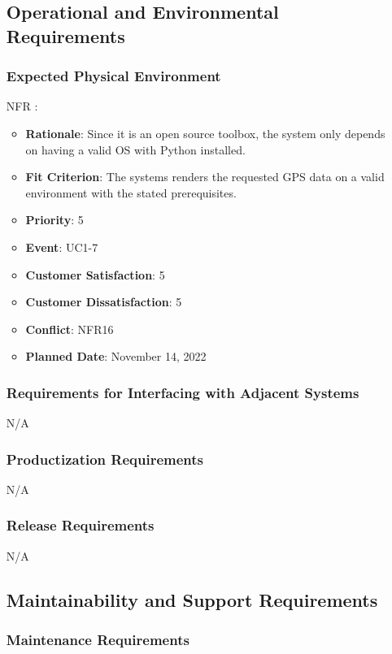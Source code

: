 \documentclass[12pt, titlepage]{article}
\newcounter{reqnum} %
\newcounter{freqnum} %
\begin{document}
\begin{itemize}
\subsection{Operational and Environmental Requirements}

\subsubsection{Expected Physical Environment}
\item[NFR\refstepcounter{freqnum}\thefreqnum
\label{NFR}:] 
\begin{itemize}
    \item \textbf{Rationale}: Since it is an open source toolbox, the system only depends on having a valid OS with Python installed.
    \item \textbf{Fit Criterion}: The systems renders the requested GPS data on a valid environment with the stated prerequisites.
    \item \textbf{Priority}: 5
    \item \textbf{Event}: UC1-7%
    \item \textbf{Customer Satisfaction}: 5
    \item \textbf{Customer Dissatisfaction}: 5
    \item \textbf{Conflict}: NFR16
    \item \textbf{Planned Date}: November 14, 2022
\end{itemize}
\subsubsection{Requirements for Interfacing with Adjacent Systems}
N/A
\subsubsection{Productization Requirements}
N/A
\subsubsection{Release Requirements}
N/A
\subsection{Maintainability and Support Requirements}

\subsubsection{Maintenance Requirements}


\end{itemize}
\end{document}
